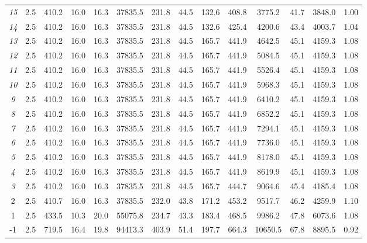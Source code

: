 \documentclass[letterpaper,11pt]{article} %
\begin{document}
\begin{table}[H]
\begin{adjustbox}{angle=90}
{\begin{tabular}{|ccccccccccccc|c|}
    \textit{15} & 2.5   & 410.2 & 16.0  & 16.3  & 37835.5 & 231.8 & 44.5  & 132.6 & 408.8 & 3775.2 & 41.7  & 3848.0 & 1.00 \\
    \textit{14} & 2.5   & 410.2 & 16.0  & 16.3  & 37835.5 & 231.8 & 44.5  & 132.6 & 425.4 & 4200.6 & 43.4  & 4003.7 & 1.04 \\
    \textit{13} & 2.5   & 410.2 & 16.0  & 16.3  & 37835.5 & 231.8 & 44.5  & 165.7 & 441.9 & 4642.5 & 45.1  & 4159.3 & 1.08 \\
    \textit{12} & 2.5   & 410.2 & 16.0  & 16.3  & 37835.5 & 231.8 & 44.5  & 165.7 & 441.9 & 5084.5 & 45.1  & 4159.3 & 1.08 \\
    \textit{11} & 2.5   & 410.2 & 16.0  & 16.3  & 37835.5 & 231.8 & 44.5  & 165.7 & 441.9 & 5526.4 & 45.1  & 4159.3 & 1.08 \\
    \textit{10} & 2.5   & 410.2 & 16.0  & 16.3  & 37835.5 & 231.8 & 44.5  & 165.7 & 441.9 & 5968.3 & 45.1  & 4159.3 & 1.08 \\
    \textit{9} & 2.5   & 410.2 & 16.0  & 16.3  & 37835.5 & 231.8 & 44.5  & 165.7 & 441.9 & 6410.2 & 45.1  & 4159.3 & 1.08 \\
    \textit{8} & 2.5   & 410.2 & 16.0  & 16.3  & 37835.5 & 231.8 & 44.5  & 165.7 & 441.9 & 6852.2 & 45.1  & 4159.3 & 1.08 \\
    \textit{7} & 2.5   & 410.2 & 16.0  & 16.3  & 37835.5 & 231.8 & 44.5  & 165.7 & 441.9 & 7294.1 & 45.1  & 4159.3 & 1.08 \\
    \textit{6} & 2.5   & 410.2 & 16.0  & 16.3  & 37835.5 & 231.8 & 44.5  & 165.7 & 441.9 & 7736.0 & 45.1  & 4159.3 & 1.08 \\
    \textit{5} & 2.5   & 410.2 & 16.0  & 16.3  & 37835.5 & 231.8 & 44.5  & 165.7 & 441.9 & 8178.0 & 45.1  & 4159.3 & 1.08 \\
    \textit{4} & 2.5   & 410.2 & 16.0  & 16.3  & 37835.5 & 231.8 & 44.5  & 165.7 & 441.9 & 8619.9 & 45.1  & 4159.3 & 1.08 \\
    \textit{3} & 2.5   & 410.2 & 16.0  & 16.3  & 37835.5 & 231.8 & 44.5  & 165.7 & 444.7 & 9064.6 & 45.4  & 4185.4 & 1.08 \\
    2     & 2.5   & 410.7 & 16.0  & 16.3  & 37835.5 & 232.0 & 43.8  & 171.2 & 453.2 & 9517.7 & 46.2  & 4259.9 & 1.10 \\
    1     & 2.5   & 433.5 & 10.3  & 20.0  & 55075.8 & 234.7 & 43.3  & 183.4 & 468.5 & 9986.2 & 47.8  & 6073.6 & 1.08 \\
    -1    & 2.5   & 719.5 & 16.4  & 19.8  & 94413.3 & 403.9 & 51.4  & 197.7 & 664.3 & 10650.5 & 67.8  & 8895.5 & 0.92 \bigstrut[b]\\
    \hline
  \end{tabular}
  }
    \end{adjustbox}
  \label{plresumen}
\end{table}
\end{document}
